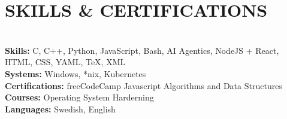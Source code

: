 \documentclass[10pt, a4paper]{article}
\begin{document}
\section*{SKILLS \& CERTIFICATIONS}
\texttt{}\\[-0.5cm]
\textbf{Skills:} C, C++, Python, JavaScript, Bash, AI Agentics, NodeJS + React, HTML, CSS, YAML, TeX, XML\\
\textbf{Systems:} Windows, *nix, Kubernetes\\
\textbf{Certifications:} freeCodeCamp Javascript Algorithms and Data Structures\\
\textbf{Courses:} Operating System Harderning\\
\textbf{Languages:} Swedish, English
\end{document}
